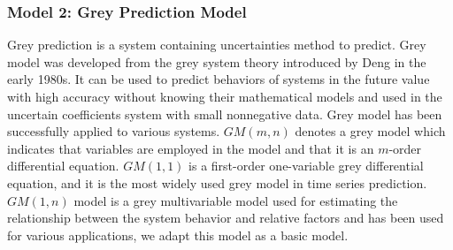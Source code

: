 \subsubsection*{Model 2: Grey Prediction Model}
\par Grey prediction is a system containing uncertainties method to predict. Grey model was developed from the grey system theory introduced by Deng in the early 1980s. It can be used to predict behaviors of systems in the future value with high accuracy without knowing their mathematical models and used in the uncertain coefficients system with small nonnegative data. Grey model has been successfully applied to various systems. $GM(m,n)$ denotes a grey model which indicates that  variables are employed in the model and that it is an $m$-order differential equation. $GM(1,1)$ is a first-order one-variable grey differential equation, and it is the most widely used grey model in time series prediction. $GM(1,n)$ model is a grey multivariable model used for estimating the relationship between the system behavior and  relative factors and has been used for various applications, we adapt this model as a basic model.
